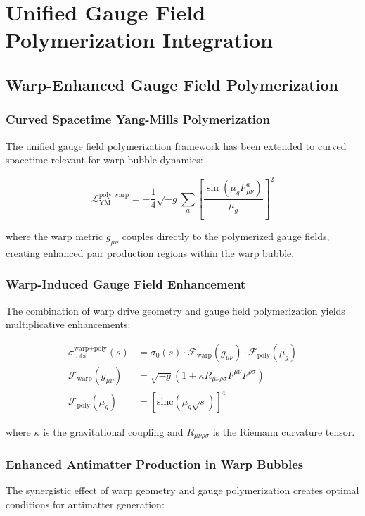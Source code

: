 \documentclass[11pt]{article}
\begin{document}
\section{Unified Gauge Field Polymerization Integration}

\subsection{Warp-Enhanced Gauge Field Polymerization}

\subsubsection{Curved Spacetime Yang-Mills Polymerization}
The unified gauge field polymerization framework has been extended to curved spacetime relevant for warp bubble dynamics:

\begin{equation}
\mathcal{L}_{\text{YM}}^{\text{poly,warp}} = -\frac{1}{4}\sqrt{-g} \sum_a \left[\frac{\sin(\mu_g F^a_{\mu\nu})}{\mu_g}\right]^2
\end{equation}

where the warp metric $g_{\mu\nu}$ couples directly to the polymerized gauge fields, creating enhanced pair production regions within the warp bubble.

\subsubsection{Warp-Induced Gauge Field Enhancement}
The combination of warp drive geometry and gauge field polymerization yields multiplicative enhancements:

\begin{align}
\sigma_{\text{total}}^{\text{warp+poly}}(s) &= \sigma_0(s) \cdot \mathcal{F}_{\text{warp}}(g_{\mu\nu}) \cdot \mathcal{F}_{\text{poly}}(\mu_g) \\
\mathcal{F}_{\text{warp}}(g_{\mu\nu}) &= \sqrt{-g} \left(1 + \kappa R_{\mu\nu\rho\sigma} F^{\mu\nu} F^{\rho\sigma}\right) \\
\mathcal{F}_{\text{poly}}(\mu_g) &= \left[\text{sinc}\left(\mu_g \sqrt{s}\right)\right]^4
\end{align}

where $\kappa$ is the gravitational coupling and $R_{\mu\nu\rho\sigma}$ is the Riemann curvature tensor.

\subsubsection{Enhanced Antimatter Production in Warp Bubbles}
The synergistic effect of warp geometry and gauge polymerization creates optimal conditions for antimatter generation:
\end{document}
